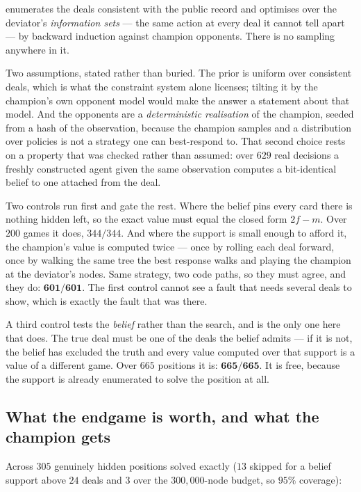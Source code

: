 \documentclass[11pt,a4paper]{article}
\begin{document}
 enumerates the deals consistent with the public record
and optimises over the deviator's \emph{information sets} --- the same action
at every deal it cannot tell apart --- by backward induction against champion
opponents. There is no sampling anywhere in it.

Two assumptions, stated rather than buried. The prior is uniform over
consistent deals, which is what the constraint system alone licenses; tilting
it by the champion's own opponent model would make the answer a statement about
that model. And the opponents are a \emph{deterministic realisation} of the
champion, seeded from a hash of the observation, because the champion samples
and a distribution over policies is not a strategy one can best-respond to.
That second choice rests on a property that was checked rather than assumed:
over $629$ real decisions a freshly constructed agent given the same
observation computes a bit-identical belief to one attached from the deal.

Two controls run first and gate the rest. Where the belief pins every card
there is nothing hidden left, so the exact value must equal the closed form
$2f - m$. Over $200$ games it does, \textbf{$344/344$}. And where the support
is small enough to afford it, the champion's value is computed twice --- once
by rolling each deal forward, once by walking the same tree the best response
walks and playing the champion at the deviator's nodes. Same strategy, two code
paths, so they must agree, and they do: $\mathbf{601/601}$. The first control
cannot see a fault that needs several deals to show, which is exactly the fault
that was there.

A third control tests the \emph{belief} rather than the search, and is the only
one here that does. The true deal must be one of the deals the belief admits ---
if it is not, the belief has excluded the truth and every value computed over
that support is a value of a different game. Over $665$ positions it is: $\mathbf{665/665}$. It is free, because the
support is already enumerated to solve the position at all.

\subsection{What the endgame is worth, and what the champion gets}

Across $305$ genuinely hidden positions solved exactly ($13$ skipped for a
belief support above $24$ deals and $3$ over the $300{,}000$-node budget, so
$95\%$ coverage):
\end{document}

